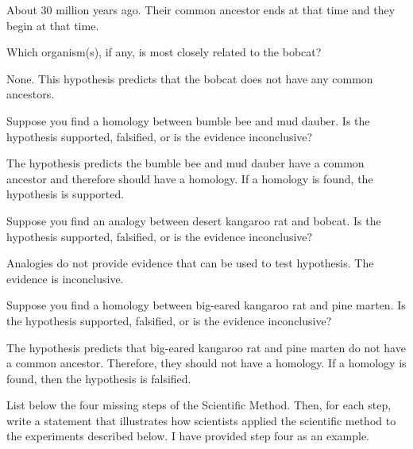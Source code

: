 \documentclass[11pt, addpoints]{exam}
\begin{document}
\begin{questions}
	\begin{solution}
		About 30 million years ago. Their common ancestor ends at that time and they begin at that time.
	\end{solution}

\question[3]
Which organism(s), if any, is most closely related to the bobcat?
	\begin{solution}
		None. This hypothesis predicts that the bobcat does not have any common ancestors.
	\end{solution}



\question[3]
Suppose you find a homology between bumble bee and mud dauber. Is the
hypothesis supported, falsified, or is the evidence inconclusive?
	\begin{solution}
		The hypothesis predicts the bumble bee and mud dauber have a common ancestor and therefore should have a homology. If a homology is found, the hypothesis is supported.
	\end{solution}


\question[3]
Suppose you find an analogy between desert kangaroo rat and bobcat. Is the
hypothesis supported, falsified, or is the evidence inconclusive?
	\begin{solution}
		Analogies do not provide evidence that can be used to test hypothesis. The evidence is inconclusive. 
	\end{solution}


\question[3]\label{last_phylo}
Suppose you find a homology between big-eared kangaroo rat and pine marten. Is
the hypothesis supported, falsified, or is the evidence inconclusive?
	\begin{solution}
		The hypothesis predicts that big-eared kangaroo rat and pine marten do not have a common ancestor. Therefore, they should not have a homology. If a homology is found, then the hypothesis is falsified.
	\end{solution}

\newpage

\question[7]
List below the four missing steps of the Scientific Method. Then,
for each step, write a statement that illustrates how scientists applied
the scientific method to the experiments described below. I have
provided step four as an example.


\end{questions}
\end{document}
